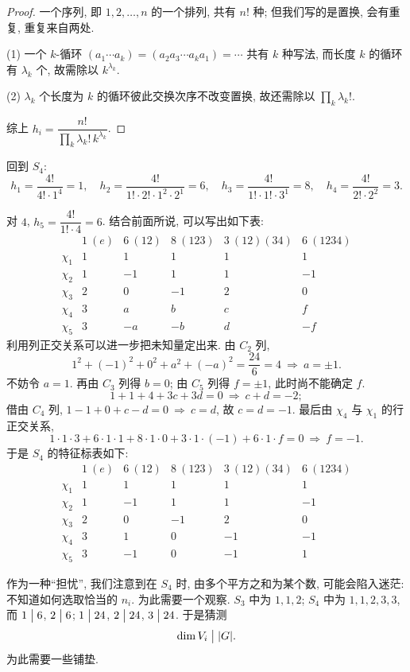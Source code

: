 \begin{proof}
一个序列, 即 $1,2,\dots,n$ 的一个排列, 共有 $n!$ 种; 但我们写的是置换,
会有重复, 重复来自两处.

(1) 一个 $k$-循环 $(a_1\cdots a_k)=(a_2a_3\cdots a_ka_1)=\cdots$ 共有 $k$ 种写法,
而长度 $k$ 的循环有 $\lambda_k$ 个, 故需除以 $k^{\lambda_k}$.

(2) $\lambda_k$ 个长度为 $k$ 的循环彼此交换次序不改变置换, 故还需除以
$\prod_k\lambda_k!$.

综上 $h_i=\dfrac{n!}{\prod_k\lambda_k!\,k^{\lambda_k}}$.
\end{proof}

回到 $S_4$:
\[
  h_1=\frac{4!}{4!\cdot1^4}=1,\quad
  h_2=\frac{4!}{1!\cdot2!\cdot1^2\cdot2^1}=6,\quad
  h_3=\frac{4!}{1!\cdot1!\cdot3^1}=8,\quad
  h_4=\frac{4!}{2!\cdot2^2}=3 .
\]

对 $4$, $h_5=\dfrac{4!}{1!\cdot4}=6$. 结合前面所说, 可以写出如下表:
\[
\begin{array}{c|ccccc}
  & 1\ (e) & 6\ (12) & 8\ (123) & 3\ (12)(34) & 6\ (1234)\\ \hline
  \chi_1 & 1 & 1 & 1 & 1 & 1\\
  \chi_2 & 1 & -1 & 1 & 1 & -1\\
  \chi_3 & 2 & 0 & -1 & 2 & 0\\
  \chi_4 & 3 & a & b & c & f\\
  \chi_5 & 3 & -a & -b & d & -f
\end{array}
\]
利用列正交关系可以进一步把未知量定出来. 由 $C_2$ 列,
\[
  1^2+(-1)^2+0^2+a^2+(-a)^2=\frac{24}{6}=4\ \Longrightarrow\ a=\pm1 .
\]
不妨令 $a=1$. 再由 $C_3$ 列得 $b=0$; 由 $C_5$ 列得 $f=\pm1$, 此时尚不能确定 $f$.
\[
  1+1+4+3c+3d=0\ \Longrightarrow\ c+d=-2 ;
\]
借由 $C_4$ 列, $1-1+0+c-d=0\ \Longrightarrow\ c=d$, 故 $c=d=-1$.
最后由 $\chi_4$ 与 $\chi_1$ 的行正交关系,
\[
  1\cdot1\cdot3+6\cdot1\cdot1+8\cdot1\cdot0+3\cdot1\cdot(-1)+6\cdot1\cdot f=0
  \ \Longrightarrow\ f=-1 .
\]
于是 $S_4$ 的特征标表如下:
\[
\begin{array}{c|ccccc}
  & 1\ (e) & 6\ (12) & 8\ (123) & 3\ (12)(34) & 6\ (1234)\\ \hline
  \chi_1 & 1 & 1 & 1 & 1 & 1\\
  \chi_2 & 1 & -1 & 1 & 1 & -1\\
  \chi_3 & 2 & 0 & -1 & 2 & 0\\
  \chi_4 & 3 & 1 & 0 & -1 & -1\\
  \chi_5 & 3 & -1 & 0 & -1 & 1
\end{array}
\]

作为一种``担忧'', 我们注意到在 $S_4$ 时, 由多个平方之和为某个数,
可能会陷入迷茫: 不知道如何选取恰当的 $n_i$. 为此需要一个观察.
$S_3$ 中为 $1,1,2$; $S_4$ 中为 $1,1,2,3,3$, 而
$1\mathrel{\big|}6$, $2\mathrel{\big|}6$; $1\mathrel{\big|}24$, $2\mathrel{\big|}24$, $3\mathrel{\big|}24$. 于是猜测
\[
  \dim V_i \mathrel{\big|} |G| .
\]
为此需要一些铺垫.

